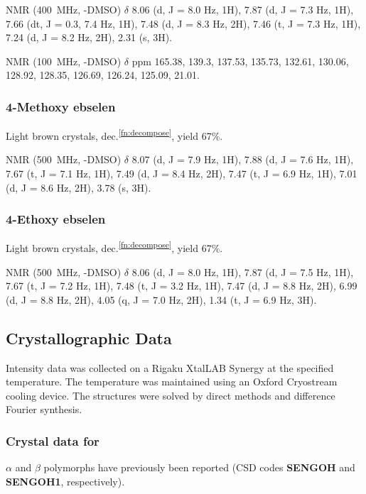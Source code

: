 \begin{refsection}
 NMR (400~MHz, -DMSO) $ \delta $ 8.06 (d, J = 8.0 Hz, 1H), 7.87 (d, J = 7.3 Hz, 1H), 7.66 (dt, J = 0.3, 7.4 Hz, 1H), 7.48 (d, J = 8.3 Hz, 2H), 7.46 (t, J = 7.3 Hz, 1H), 7.24 (d, J = 8.2 Hz, 2H), 2.31 (s, 3H).

 NMR (100~MHz, -DMSO) $\delta$ ppm 165.38, 139.3, 137.53, 135.73, 132.61, 130.06, 128.92, 128.35, 126.69, 126.24, 125.09, 21.01.

\subsubsection{4-Methoxy ebselen }
Light brown crystals, dec.\textsuperscript{\ref{fn:decompose}}, yield 67\%.

 NMR (500~MHz, -DMSO) $ \delta $ 8.07 (d, J = 7.9 Hz, 1H), 7.88 (d, J = 7.6 Hz, 1H), 7.67 (t, J = 7.1 Hz, 1H), 7.49 (d, J = 8.4 Hz, 2H), 7.47 (t, J = 6.9 Hz, 1H), 7.01 (d, J = 8.6 Hz, 2H), 3.78 (s, 3H).

\subsubsection{4-Ethoxy ebselen }
Light brown crystals, dec.\textsuperscript{\ref{fn:decompose}}, yield 67\%.

 NMR (500~MHz, -DMSO) $ \delta $ 8.06 (d, J = 8.0 Hz, 1H), 7.87 (d, J = 7.5 Hz, 1H), 7.67 (t, J = 7.2 Hz, 1H), 7.48 (t, J = 3.2 Hz, 1H), 7.47 (d, J = 8.8 Hz, 2H), 6.99 (d, J = 8.8 Hz, 2H), 4.05 (q, J = 7.0 Hz, 2H), 1.34 (t, J = 6.9 Hz, 3H).


\subsection{Crystallographic Data}
Intensity data was collected on a Rigaku XtalLAB Synergy at the specified temperature. The temperature was maintained using an Oxford Cryostream cooling device. The structures were solved by direct methods and difference Fourier synthesis.\autocite{Sheldrick2015}


\subsubsection{Crystal data for \texorpdfstring{}{C13 H9 N O Se}}
$\alpha$ and $\beta$ polymorphs have previously been reported (CSD codes \textbf{SENGOH} and \textbf{SENGOH1}, respectively).\autocite{Dupont1990StructuresII}


\end{refsection}
